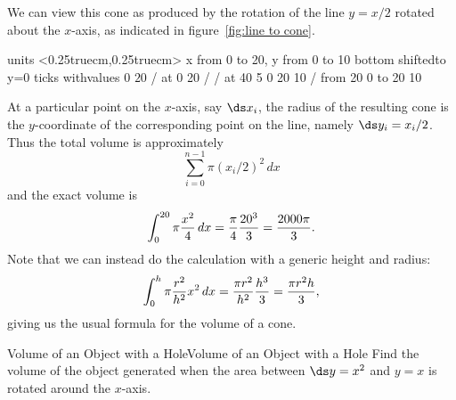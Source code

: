 \begin{solution}
We can view this cone as produced by the rotation of the line
$y=x/2$ rotated about the $x$-axis, as indicated in
figure~\ref{fig:line to cone}.

\figure[H]
\centerline{\vbox{\beginpicture
\normalgraphs
\setcoordinatesystem units <0.25truecm,0.25truecm>
\setplotarea x from 0 to 20, y from 0 to 10
\axis bottom shiftedto y=0 ticks withvalues {$0$} {$20$} / at 0 20 / /
 at 40 5
 0 20 10 /
\putrule from 20 0 to 20 10
\endpicture}}
\caption{\label{fig:line to cone}
A region that generates a cone; approximating the volume
by circular disks.}
\endfigure

At a particular point on the $x$-axis, say $\ds x_i$, the radius of the
resulting cone is the $y$-coordinate of the corresponding point on the
line, namely $\ds y_i=x_i/2$. Thus the total volume is approximately
$$\sum_{i=0}^{n-1} \pi (x_i/2)^2\,dx$$
and the exact volume is
$$
  \int_0^{20} \pi
  {x^2\over4}\,dx={\pi\over4}{20^3\over3}={2000\pi\over3}.
$$ 
Note that we can instead do the calculation with a generic height and
radius: 
$$
  \int_0^{h} \pi{r^2\over h^2}x^2\,dx
  ={\pi r^2\over h^2}{h^3\over3}={\pi r^2h\over3},
$$ 
giving us the usual formula for the volume of a cone.
\end{solution}

\begin{example}{Volume of an Object with a Hole}{Volume of an Object with a Hole}\label{Volume of an Object with a Hole}
Find the volume of the object generated when the area between
$\ds y=x^2$ and $y=x$ is rotated around the $x$-axis. 
\end{example}

